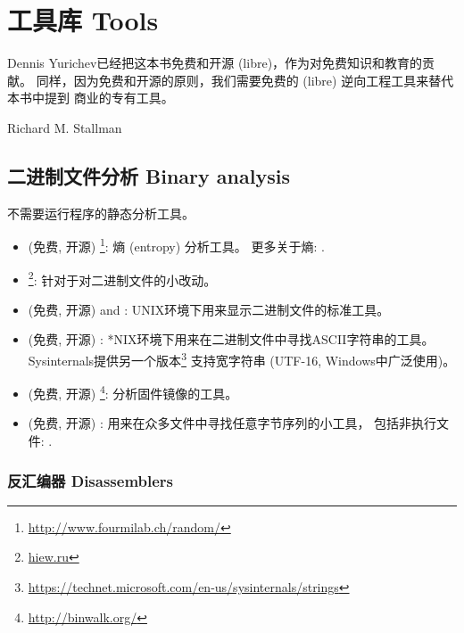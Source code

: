 \documentclass[UTF8,nofonts]{ctexart}
\begin{document}

\chapter{工具库 Tools}

\epigraph{
Dennis Yurichev已经把这本书免费和开源 (libre)，作为对免费知识和教育的贡献。
同样，因为免费和开源的原则，我们需要免费的 (libre) 逆向工程工具来替代本书中提到
商业的专有工具。}{Richard M. Stallman}

\section{二进制文件分析 Binary analysis}

不需要运行程序的静态分析工具。


\begin{itemize}
\item
(免费, 开源) \footnote{\url{http://www.fourmilab.ch/random/}}: 熵 (entropy) 分析工具。
更多关于熵: .

\item
\label{Hiew}
\footnote{\href{http://go.yurichev.com/17035}{hiew.ru}}:
针对于对二进制文件的小改动。

\item (免费, 开源)  and : UNIX环境下用来显示二进制文件的标准工具。

\item (免费, 开源) : *NIX环境下用来在二进制文件中寻找ASCII字符串的工具。
Sysinternals提供另一个版本\footnote{\url{https://technet.microsoft.com/en-us/sysinternals/strings}}
支持宽字符串 (UTF-16, Windows中广泛使用)。

\item (免费, 开源) \footnote{\url{http://binwalk.org/}}: 分析固件镜像的工具。

\item
{}
(免费, 开源) :
用来在众多文件中寻找任意字节序列的小工具，
包括非执行文件: \BGREPURL.
\end{itemize}

\subsection{反汇编器 Disassemblers}
\end{document}

